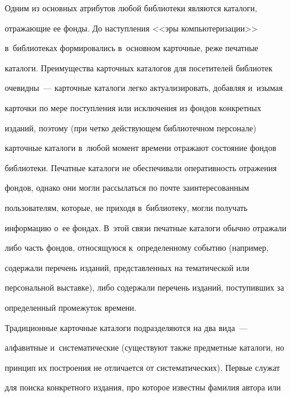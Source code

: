      \thispagestyle{headings}


      


      \vspace*{-10pt} 


  


  Одним из основных атрибутов любой биб\-лио\-те\-ки являются каталоги, 


отражающие ее фонды. До наступления <<эры компьютеризации>> 


в~биб\-лио\-те\-ках формировались в~основном карточные, реже печатные 


каталоги. Преимущества карточных каталогов для посетителей библиотек 


очевидны~--- карточные каталоги легко актуализировать, до\-бав\-ляя и~изымая 


карточки по мере поступления или исключения из фондов конкретных 


изданий, поэтому (при чет\-ко действующем биб\-лио\-теч\-ном персонале) 


карточные каталоги в~любой момент времени отражают состояние фондов 


биб\-лио\-те\-ки. Печатные каталоги не обеспечивали оперативность отражения 


фондов, однако они могли рассылаться по почте заинтересованным 


пользователям, которые, не приходя в~биб\-лио\-те\-ку, могли получать 


информацию о~ее фондах. В~этой связи печатные каталоги обычно отражали 


либо часть фондов, относящуюся к~определенному событию (например, 


содержали перечень изданий, пред\-став\-лен\-ных на тематической или 


персональной вы\-став\-ке), либо содержали перечень изданий, поступивших за 


определенный промежуток времени. 


  


  Традиционные карточные каталоги подразделяются на два вида~--- 


алфавитные и~сис\-те\-ма\-ти\-че\-ские (существуют так\-же предметные каталоги, но 


принцип их построения не отличается от систематических). Пер\-вые служат 


для поиска конкретного издания, про которое известны фамилия автора или 


